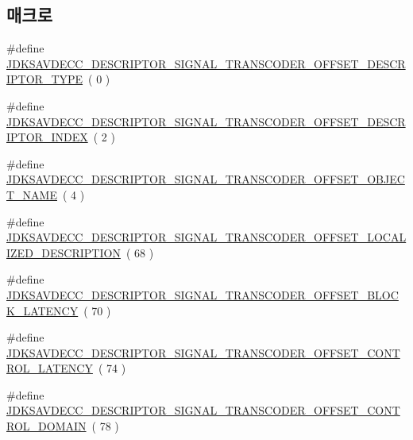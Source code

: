 \subsection*{매크로}
\begin{DoxyCompactItemize}
\item 
\#define \hyperlink{group__descriptor__transcoder_ga607f8a2f42e45112fc31eb798ac0f7fd}{J\+D\+K\+S\+A\+V\+D\+E\+C\+C\+\_\+\+D\+E\+S\+C\+R\+I\+P\+T\+O\+R\+\_\+\+S\+I\+G\+N\+A\+L\+\_\+\+T\+R\+A\+N\+S\+C\+O\+D\+E\+R\+\_\+\+O\+F\+F\+S\+E\+T\+\_\+\+D\+E\+S\+C\+R\+I\+P\+T\+O\+R\+\_\+\+T\+Y\+PE}~( 0 )
\item 
\#define \hyperlink{group__descriptor__transcoder_gad3fe14089e20cea3aad46cf396e0fa3b}{J\+D\+K\+S\+A\+V\+D\+E\+C\+C\+\_\+\+D\+E\+S\+C\+R\+I\+P\+T\+O\+R\+\_\+\+S\+I\+G\+N\+A\+L\+\_\+\+T\+R\+A\+N\+S\+C\+O\+D\+E\+R\+\_\+\+O\+F\+F\+S\+E\+T\+\_\+\+D\+E\+S\+C\+R\+I\+P\+T\+O\+R\+\_\+\+I\+N\+D\+EX}~( 2 )
\item 
\#define \hyperlink{group__descriptor__transcoder_ga3c03f51d5cdf0c2f48ba9db7956bd47f}{J\+D\+K\+S\+A\+V\+D\+E\+C\+C\+\_\+\+D\+E\+S\+C\+R\+I\+P\+T\+O\+R\+\_\+\+S\+I\+G\+N\+A\+L\+\_\+\+T\+R\+A\+N\+S\+C\+O\+D\+E\+R\+\_\+\+O\+F\+F\+S\+E\+T\+\_\+\+O\+B\+J\+E\+C\+T\+\_\+\+N\+A\+ME}~( 4 )
\item 
\#define \hyperlink{group__descriptor__transcoder_gac6fb8e18a4222c3ec8a7f4f0a73b76f9}{J\+D\+K\+S\+A\+V\+D\+E\+C\+C\+\_\+\+D\+E\+S\+C\+R\+I\+P\+T\+O\+R\+\_\+\+S\+I\+G\+N\+A\+L\+\_\+\+T\+R\+A\+N\+S\+C\+O\+D\+E\+R\+\_\+\+O\+F\+F\+S\+E\+T\+\_\+\+L\+O\+C\+A\+L\+I\+Z\+E\+D\+\_\+\+D\+E\+S\+C\+R\+I\+P\+T\+I\+ON}~( 68 )
\item 
\#define \hyperlink{group__descriptor__transcoder_ga01d462c88ea98189f0b7ff5635f2e795}{J\+D\+K\+S\+A\+V\+D\+E\+C\+C\+\_\+\+D\+E\+S\+C\+R\+I\+P\+T\+O\+R\+\_\+\+S\+I\+G\+N\+A\+L\+\_\+\+T\+R\+A\+N\+S\+C\+O\+D\+E\+R\+\_\+\+O\+F\+F\+S\+E\+T\+\_\+\+B\+L\+O\+C\+K\+\_\+\+L\+A\+T\+E\+N\+CY}~( 70 )
\item 
\#define \hyperlink{group__descriptor__transcoder_ga63dc48de6d73c6c8043d8fb01b442f7c}{J\+D\+K\+S\+A\+V\+D\+E\+C\+C\+\_\+\+D\+E\+S\+C\+R\+I\+P\+T\+O\+R\+\_\+\+S\+I\+G\+N\+A\+L\+\_\+\+T\+R\+A\+N\+S\+C\+O\+D\+E\+R\+\_\+\+O\+F\+F\+S\+E\+T\+\_\+\+C\+O\+N\+T\+R\+O\+L\+\_\+\+L\+A\+T\+E\+N\+CY}~( 74 )
\item 
\#define \hyperlink{group__descriptor__transcoder_ga84409ec628bc752fadcb7f630523a1f2}{J\+D\+K\+S\+A\+V\+D\+E\+C\+C\+\_\+\+D\+E\+S\+C\+R\+I\+P\+T\+O\+R\+\_\+\+S\+I\+G\+N\+A\+L\+\_\+\+T\+R\+A\+N\+S\+C\+O\+D\+E\+R\+\_\+\+O\+F\+F\+S\+E\+T\+\_\+\+C\+O\+N\+T\+R\+O\+L\+\_\+\+D\+O\+M\+A\+IN}~( 78 )

\end{DoxyCompactItemize}
